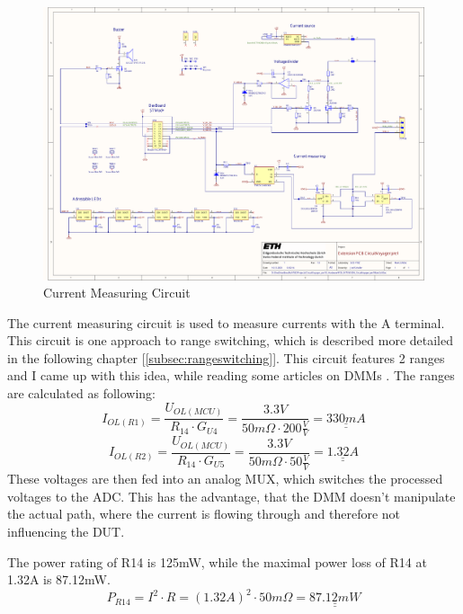 \begin{figure}[H]
	\centering
	\includegraphics[width=14cm, trim={19.5cm 5cm 1cm 14.5cm}, clip]{../../../5_Hardware/PCB_EXTENSION_CircuitVoyager_pre1/Project Outputs for PCB_EXT_CV_PRE1/Schematic_PCB_EXTENSION_CircuitVoyager_pre1.pdf}
	\caption{Current Measuring Circuit}
	\label{fig:Current Measuring Circuit}
\end{figure}

The current measuring circuit is used to measure currents with the A terminal. This circuit is one approach to range switching, which is described more detailed in the following chapter [\ref{subsec:rangeswitching}]. This circuit features 2 ranges and I came up with this idea, while reading some articles on DMMs \cite{Digital_multimeter_circuit_using_ICL7107} \cite{AN-202_A_Digital_Multimeter_Using_the_ADD3501}. The ranges are calculated as following:
\[I_{OL(R1)} = \frac{U_{OL(MCU)}}{R_{14} \cdot G_{U4}} = \frac{3.3V}{50m\Omega \cdot 200\frac{V}{V}} = \underline{\underline{330mA}}\]
\[I_{OL(R2)} = \frac{U_{OL(MCU)}}{R_{14} \cdot G_{U5}} = \frac{3.3V}{50m\Omega \cdot 50\frac{V}{V}} = \underline{\underline{1.32A}}\]
These voltages are then fed into an analog MUX, which switches the processed voltages to the ADC. This has the advantage, that the DMM doesn't manipulate the actual path, where the current is flowing through and therefore not influencing the DUT.

The power rating of R14 is 125mW, while the maximal power loss of R14 at 1.32A is 87.12mW.
\[P_{R14} = I^2 \cdot R = (1.32A)^2 \cdot 50m \Omega = \underline{\underline{87.12mW}}\]



